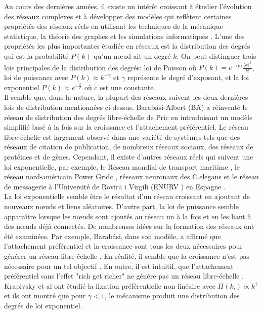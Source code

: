 Au cours des dernières années, il existe un intérêt croissant à étudier l'évolution des réseaux complexes et à développer des modèles qui reflètent certaines propriétés des réseaux réels en utilisant les techniques de la mécanique statistique, la théorie des graphes et les simulations informatiques \cite{BA1999,AB2002,Dorogovtsev-Mendes2002,Newman2003}. L'une des propriétés les plus importantes étudiée en réseaux est la distribution des degrés qui est la probabilité $P(k)$ qu'un nœud ait un degré $k$.
On peut distinguer trois lois principales de la distribution des degrés: loi de Poisson où $P(k)=e^{-\langle k\rangle}\frac{\langle k\rangle^k}{k!}$, loi de puissance avec $P(k)\approx k^{-\gamma}$ et $\gamma$ représente le degré d'exposant, et la loi exponentiel $P(k)\approx e^{-\frac{k}{c}}$ où $c$ est une constante.\\
Il semble que, dans la nature, la plupart des réseaux suivent les deux dernières lois de distribution mentionnées ci-dessus. Barab\'{a}si-Albert (BA) a réinventé le réseau de distribution des degrés libre-échelle de Pric en introduisant un modèle simplifié basé à la fois sur la croissance et l'attachement préférentiel. Le réseau libre-échelle est largement observé dans une variété de systèmes tels que des réseaux de citation de publication, de nombreux réseaux sociaux, des réseaux de protéines et de gènes. Cependant, il existe d'autres réseaux réels qui suivent une loi exponentielle, par exemple, le Réseau mondial de transport maritime \cite{ Deng-al2009}, le réseau nord-américain Power Gridc \cite{Albert-al2004}, réseaux neuronaux des C.elegans \cite{Achacoso-Yamamoto1992} et le réseau de messagerie à l'Université de Rovira i Virgili (ENURV ) en Espagne \cite{Albert-al2004}.\\
La loi exponentielle semble être le résultat d'un réseau croissant en ajoutant de nouveaux nœuds et liens aléatoires. D'autre part, la loi de puissance semble apparaître lorsque les nœuds sont ajoutés au réseau un à la fois et en les liant à des nœuds déjà connectés.
De nombreuses idées sur la formation des réseaux ont été examinées. Par exemple, Barab\'{a}si, dans son modèle, a affirmé que l'attachement préférentiel et la croissance sont tous les deux nécessaires pour générer un réseau libre-échelle \cite{BA-al1999}. En réalité, il semble que la croissance n'est pas nécessaire pour un tel objectif \cite{Xie-al2008}. En outre, il est intuitif, que l'attachement préférentiel sans l'effet "rich get richer" ne génère pas un réseau libre-échelle \cite{Samalam}. Krapivsky et al \cite{Krapivsky-al2000} ont étudié la fixation préférentielle non linéaire avec $\Pi(k_i)\varpropto k^{\gamma}$ et ils ont montré que pour $\gamma<1$, le mécanisme produit une distribution des degrés de loi exponentiel.

